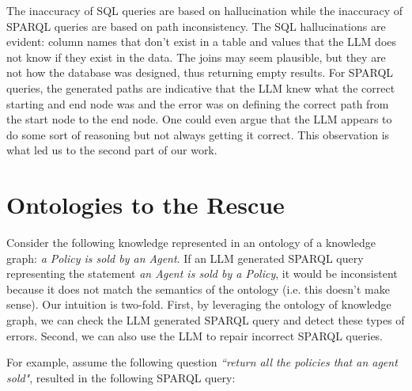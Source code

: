 \documentclass[11pt]{article}
\begin{document}

The inaccuracy of SQL queries are based on hallucination while the inaccuracy of SPARQL queries are based on path inconsistency. 
The SQL hallucinations are evident: column names that don’t exist in a table and values that the LLM does not know if they exist in the data.
The joins may seem plausible, but they are not how the database was designed, thus returning empty results. 
For SPARQL queries, the generated paths are indicative that the LLM knew what the correct starting and end node was and the error was on defining the correct path from the start node to the end node. 
One could even argue that the LLM appears to do some sort of reasoning but not always getting it correct.
This observation is what led us to the second part of our work. 


\section{Ontologies to the Rescue}

Consider the following knowledge represented in an ontology of a knowledge graph: \textit{a Policy is sold by an Agent}. 
If an LLM generated SPARQL query representing the statement \textit{an Agent is sold by a Policy}, it would be inconsistent because it does not match the semantics of the ontology (i.e. this doesn't make sense). 
Our intuition is two-fold. 
First, by leveraging the ontology of knowledge graph, we can check the LLM generated SPARQL query and detect these types of errors. 
Second, we can also use the LLM to repair incorrect SPARQL queries.

For example, assume the following question \textit{``return all the policies that an agent sold"}, resulted in the following SPARQL query:
\end{document}
